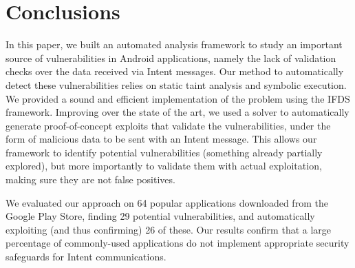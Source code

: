 \section{Conclusions}
\label{sec:concl}

In this paper, we built an automated analysis framework to study an important source of vulnerabilities in Android applications, namely the lack of validation checks over the data received via Intent messages. Our method to automatically detect these vulnerabilities relies on static taint analysis and symbolic execution. We provided a sound and efficient implementation of the problem using the IFDS framework. Improving over the state of the art, we used a solver to automatically generate proof-of-concept exploits that validate the vulnerabilities, under the form of malicious data to be sent with an Intent message. This allows our framework to identify potential vulnerabilities (something already partially explored), but more importantly to validate them with actual exploitation, making sure they are not false positives.

We evaluated our approach on 64 popular applications downloaded from the Google Play Store, finding 29 potential vulnerabilities, and automatically exploiting (and thus confirming) 26 of these. Our results confirm that a large percentage of commonly-used applications do not implement appropriate security safeguards for Intent communications.